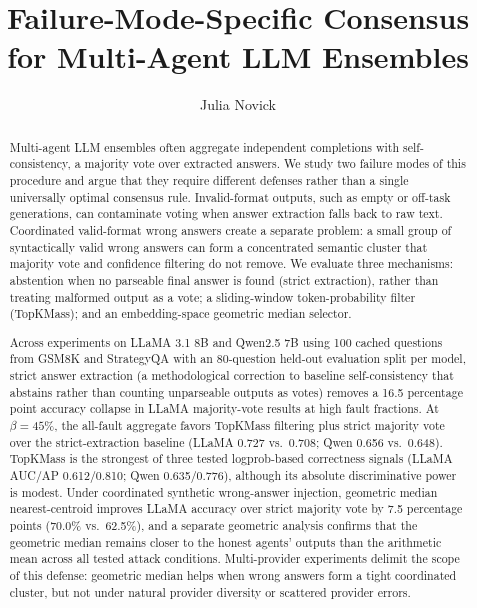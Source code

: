\documentclass[11pt]{article}
\title{\textbf{Failure-Mode-Specific Consensus\\
       for Multi-Agent LLM Ensembles}}
\author{Julia Novick}
\date{}
\begin{document}
\maketitle

\begin{abstract}
Multi-agent LLM ensembles often aggregate independent completions with
self-consistency, a majority vote over extracted answers. We study two failure
modes of this procedure and argue that they require different defenses rather
than a single universally optimal consensus rule. Invalid-format
outputs, such as empty or off-task generations, can contaminate voting when
answer extraction falls back to raw text. Coordinated valid-format wrong answers
create a separate problem: a small group of syntactically valid wrong answers can
form a concentrated semantic cluster that majority vote and confidence filtering
do not remove. We evaluate three mechanisms: abstention when no parseable final
answer is found (strict extraction), rather than treating malformed output as a
vote; a sliding-window token-probability filter (TopKMass); and an
embedding-space geometric median selector.

Across experiments on LLaMA 3.1 8B and Qwen2.5 7B using 100 cached questions
from GSM8K and StrategyQA with an 80-question held-out evaluation split per
model, strict answer extraction (a methodological correction to baseline
self-consistency that abstains rather than counting unparseable outputs as
votes) removes a 16.5 percentage point accuracy collapse in LLaMA majority-vote
results at high fault fractions. At $\beta=45\%$, the all-fault aggregate
favors TopKMass filtering plus strict majority vote over the strict-extraction
baseline (LLaMA 0.727 vs.\ 0.708; Qwen 0.656 vs.\ 0.648). TopKMass is the strongest of three tested
logprob-based correctness signals (LLaMA AUC/AP 0.612/0.810; Qwen 0.635/0.776),
although its absolute discriminative power is modest. Under coordinated synthetic
wrong-answer injection, geometric median nearest-centroid improves LLaMA
accuracy over strict majority vote by 7.5 percentage points (70.0\% vs.\ 62.5\%),
and a separate geometric analysis confirms that the geometric median remains
closer to the honest agents' outputs than the arithmetic mean across all tested
attack conditions. Multi-provider experiments delimit the scope of this defense:
geometric median helps when wrong answers form a tight coordinated cluster, but
not under natural provider diversity or scattered provider errors.
\end{abstract}
\end{document}
